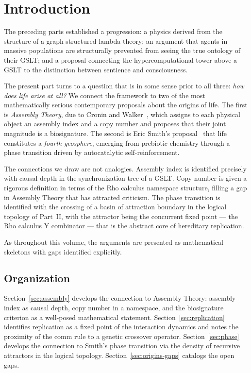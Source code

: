 \chapter{Introduction}
\label{sec:origins-intro}

The preceding parts established a progression: a physics derived
from the structure of a graph-structured lambda theory; an argument
that agents in massive populations are structurally prevented from
seeing the true ontology of their GSLT; and a proposal connecting
the hypercomputational tower above a GSLT to the distinction between
sentience and consciousness.

The present part turns to a question that is in some sense prior to
all three: \emph{how does life arise at all?}
We connect the framework to two of the most mathematically serious
contemporary proposals about the origins of life.
The first is \emph{Assembly Theory}, due to Cronin and
Walker~\cite{cronin2023assembly}, which assigns to each physical
object an assembly index and a copy number and proposes that
their joint magnitude is a biosignature.
The second is Eric Smith's proposal~\cite{smith2016origin} that
life constitutes a \emph{fourth geosphere}, emerging from prebiotic
chemistry through a phase transition driven by autocatalytic
self-reinforcement.

The connections we draw are not analogies.
Assembly index is identified precisely with causal depth in the
synchronization tree of a GSLT.
Copy number is given a rigorous definition in terms of the
Rho calculus namespace structure, filling a gap in Assembly
Theory that has attracted criticism.
The phase transition is identified with the crossing of a basin
of attraction boundary in the logical topology of Part~II,
with the attractor being the concurrent fixed point --- the
Rho calculus Y combinator --- that is the abstract core of
hereditary replication.

As throughout this volume, the arguments are presented as
mathematical skeletons with gaps identified explicitly.

\section{Organization}

Section~\ref{sec:assembly} develops the connection to Assembly
Theory: assembly index as causal depth, copy number in a namespace,
and the biosignature criterion as a well-posed mathematical
statement.
Section~\ref{sec:replication} identifies replication as a fixed
point of the interaction dynamics and notes the proximity of the
comm rule to a genetic crossover operator.
Section~\ref{sec:phase} develops the connection to Smith's phase
transition via the density of recursive attractors in the logical
topology.
Section~\ref{sec:origins-gaps} catalogs the open gaps.

